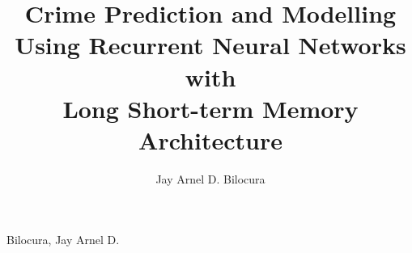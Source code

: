 \title{Crime Prediction and Modelling Using Recurrent Neural Networks with\\
    Long Short-term Memory Architecture}

\author{Jay Arnel D. Bilocura}{Bilocura, Jay Arnel D.}



